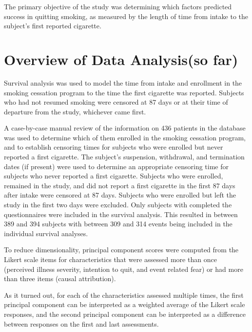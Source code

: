 \documentclass[12pt]{article}
\begin{document}
\par\vspace{0.3 cm}
The primary objective of the study was determining which factors predicted success in quitting smoking, as measured by the length of time from intake to the subject's first reported cigarette.
\section*{Overview of Data Analysis(so far)}
Survival analysis was used to model the time from intake and enrollment in the smoking cessation program to the time the first cigarette was reported.   Subjects who had not resumed smoking were censored at 87 days or at their time of departure from the study, whichever came first.
\par\vspace{0.3 cm}
A case-by-case manual review of the information on 436 patients in the database was used to determine which of them enrolled in the smoking cessation program, and to establish censoring times for subjects who were enrolled but never reported a first cigarette.  The subject's suspension, withdrawal, and termination dates (if present) were used to determine an appropriate censoring time for subjects who never reported a first cigarette.  Subjects who were enrolled, remained in the study, and did not report a first cigarette in the first 87 days after intake were censored at 87 days.  Subjects who were enrolled but left the study in the first two days were excluded.  Only subjects with completed the questionnaires were included in the survival analysis.  This resulted in between 389 and 394 subjects with between 309 and 314 events being included in the individual survival analyses.  
\par\vspace{0.3 cm}
To reduce dimensionality, principal component scores were computed from the Likert scale items for characteristics that were assessed more than once (perceived illness severity, intention to quit, and event related fear) or had more than three items (causal attribution).  
\par\vspace{0.3 cm}
As it turned out, for each of the characteristics assessed multiple times, the first principal component can be interpreted as a weighted average of the Likert scale responses, and the second principal component can be interpreted as a difference between responses on the first and last assessments.  
\par\vspace{0.3 cm}
\end{document}

